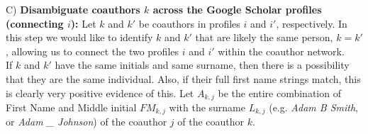 C)  {\bf Disambiguate coauthors $k$ across the Google Scholar profiles (connecting $i$):} Let  $k$ and $k'$ be coauthors in profiles $i$ and $i'$, respectively.   In this step we would like to identify $k$ and $k'$ that are likely the same person, $k=k'$, allowing us to connect the two profiles $i$ and $i'$ within the coauthor network.\\

 If $k$ and $k'$ have the same initials and same surname, then there is a possibility that they are the same individual. Also, if their full first name strings match, this is clearly very positive evidence of this. Let $A_{k,j}$ be the entire combination of First Name and Middle initial $FM_{k,j}$ with the surname $L_{k,j}$ (e.g. {\it Adam B Smith}, or {\it Adam \_ Johnson}) of the coauthor $j$ of the coauthor $k$. 

